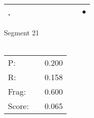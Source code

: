 \documentclass[landscape]{article}
\newcommand{\ssp}{\hspace{2pt}}
\newcommand{\mex}{\cellcolor{g}$\bullet$}
\begin{document}
\begin{tabular}{|l|p{10pt}|p{10pt}|p{10pt}|p{10pt}|p{10pt}|p{10pt}|p{10pt}|p{10pt}|p{10pt}|}
\hline
\ssp \cellcolor{ref8}. \ssp&\hspace{2pt}&\hspace{2pt}&\hspace{2pt}&\hspace{2pt}&\hspace{2pt}&\hspace{2pt}&\hspace{2pt}&\hspace{2pt}&\hspace{2pt}\mex\\
\hline
\end{tabular}

\vspace{6pt}
\noindent Segment 21\\\\
\noindent\begin{tabular}{lm{12pt}r}
\hline
P:&&0.200\\
R:&&0.158\\
Frag:&&0.600\\
Score:&&0.065\\
\end{tabular}

\newpage
\end{document}

